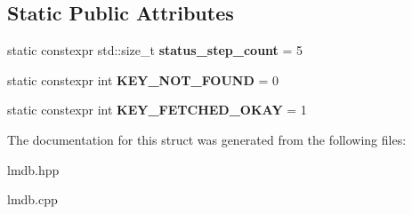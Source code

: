 \subsection*{Static Public Attributes}
\begin{DoxyCompactItemize}
\item 
\mbox{\label{structmods_1_1lmdb_1_1__db__handle_a519bd0169f07df34cf61f424b217dc1e}} 
static constexpr std\+::size\+\_\+t {\bfseries status\+\_\+step\+\_\+count} = 5
\item 
\mbox{\label{structmods_1_1lmdb_1_1__db__handle_ac33ded24f41a4f32c3b2a22238bdecc7}} 
static constexpr int {\bfseries K\+E\+Y\+\_\+\+N\+O\+T\+\_\+\+F\+O\+U\+ND} = 0
\item 
\mbox{\label{structmods_1_1lmdb_1_1__db__handle_a93a0e99651faadc18dc46cd940819600}} 
static constexpr int {\bfseries K\+E\+Y\+\_\+\+F\+E\+T\+C\+H\+E\+D\+\_\+\+O\+K\+AY} = 1
\end{DoxyCompactItemize}


The documentation for this struct was generated from the following files\+:\begin{DoxyCompactItemize}
\item 
lmdb.\+hpp\item 
lmdb.\+cpp\end{DoxyCompactItemize}
